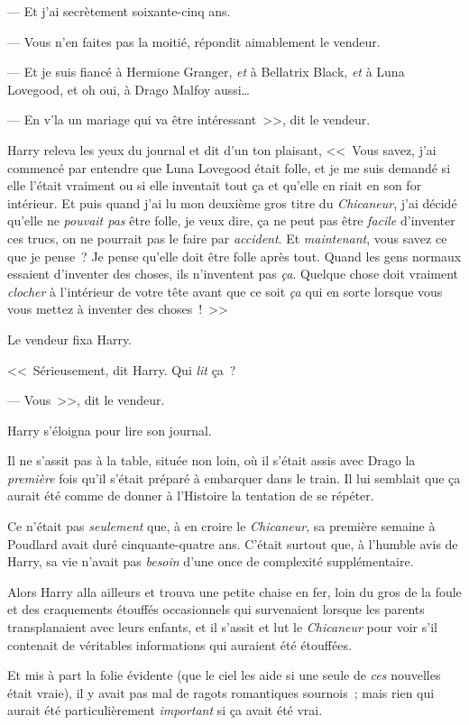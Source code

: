 --- Et j'ai secrètement soixante-cinq ans.

--- Vous n'en faites pas la moitié, répondit aimablement le vendeur.

--- Et je suis fiancé à Hermione Granger, \emph{et} à Bellatrix Black, \emph{et} à Luna Lovegood, et oh oui, à Drago Malfoy aussi…

--- En v'la un mariage qui va être intéressant~>>, dit le vendeur.

Harry releva les yeux du journal et dit d'un ton plaisant, <<~Vous savez, j'ai commencé par entendre que Luna Lovegood était folle, et je me suis demandé si elle l'était vraiment ou si elle inventait tout ça et qu'elle en riait en son for intérieur. Et puis quand j'ai lu mon deuxième gros titre du \emph{Chicaneur}, j'ai décidé qu'elle ne \emph{pouvait pas} être folle, je veux dire, ça ne peut pas être \emph{facile} d'inventer ces trucs, on ne pourrait pas le faire par \emph{accident}. Et \emph{maintenant}, vous savez ce que je pense~? Je pense qu'elle doit être folle après tout. Quand les gens normaux essaient d'inventer des choses, ils n'inventent pas \emph{ça}. Quelque chose doit vraiment \emph{clocher} à l'intérieur de votre tête avant que ce soit \emph{ça} qui en sorte lorsque vous vous mettez à inventer des choses~!~>>

Le vendeur fixa Harry.

<<~Sérieusement, dit Harry. Qui \emph{lit} ça~?

--- Vous~>>, dit le vendeur.

Harry s'éloigna pour lire son journal.

Il ne s'assit pas à la table, située non loin, où il s'était assis avec Drago la \emph{première} fois qu'il s'était préparé à embarquer dans le train. Il lui semblait que ça aurait été comme de donner à l'Histoire la tentation de se répéter.

Ce n'était pas \emph{seulement} que, à en croire le \emph{Chicaneur}, sa première semaine à Poudlard avait duré cinquante-quatre ans. C'était surtout que, à l'humble avis de Harry, sa vie n'avait pas \emph{besoin} d'une once de complexité supplémentaire.

Alors Harry alla ailleurs et trouva une petite chaise en fer, loin du gros de la foule et des craquements étouffés occasionnels qui survenaient lorsque les parents transplanaient avec leurs enfants, et il s'assit et lut le \emph{Chicaneur} pour voir s'il contenait de véritables informations qui auraient été étouffées.

Et mis à part la folie évidente (que le ciel les aide si une seule de \emph{ces} nouvelles était vraie), il y avait pas mal de ragots romantiques sournois~; mais rien qui aurait été particulièrement \emph{important} si ça avait été vrai.

